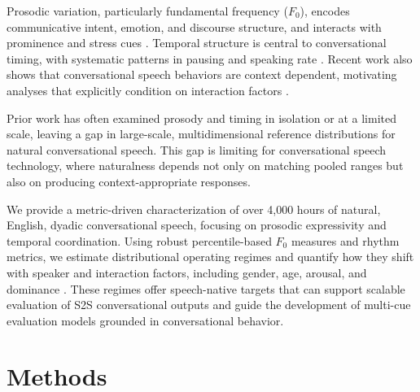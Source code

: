 \documentclass{Interspeech}
\begin{document}
Prosodic variation, particularly fundamental frequency ($F_0$), encodes communicative intent, emotion, and discourse structure, and interacts with prominence and stress cues \cite{banziger_role_2005, pell_emotional_2011, xu_speech_2005, sluijter_acoustic_1996, sluijter_spectral_1996}. 
Temporal structure is central to conversational timing, with systematic patterns in pausing and speaking rate \cite{goldman1958speech, pellegrino_automatic_2004, pellegrino_across-language_2011, jiao_estimating_2015, morgan_combining_1998, nanjo_language_2004}. 
Recent work also shows that conversational speech behaviors are context dependent, motivating analyses that explicitly condition on interaction factors \cite{wynn_conversational_2024}.

Prior work has often examined prosody and timing in isolation or at a limited scale, leaving a gap in large-scale, multidimensional reference distributions for natural conversational speech. 
This gap is limiting for conversational speech technology, where naturalness depends not only on matching pooled ranges but also on producing context-appropriate responses.

We provide a metric-driven characterization of over 4{,}000 hours of natural, English, dyadic conversational speech, focusing on prosodic expressivity and temporal coordination. 
Using robust percentile-based $F_0$ measures and rhythm metrics, we estimate distributional operating regimes and quantify how they shift with speaker and interaction factors, including gender, age, arousal, and dominance \cite{wynn_conversational_2024, traunmuller_acoustic_2000}. 
These regimes offer speech-native targets that can support scalable evaluation of S2S conversational outputs and guide the development of multi-cue evaluation models grounded in conversational behavior.

\vspace{-1mm}

\section{Methods}

\vspace{-3mm}
\end{document}
